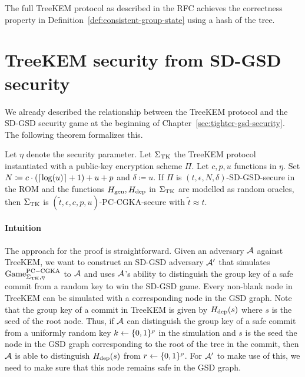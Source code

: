 The full TreeKEM protocol as described in the RFC achieves the correctness property in Definition~\ref{def:consistent-group-state} using a hash of the tree.

\section{TreeKEM security from SD-GSD security}


We already described the relationship between the TreeKEM protocol and the SD-GSD security game at the beginning of Chapter~\ref{sec:tighter-gsd-security}. The following theorem formalizes this.

\begin{theorem}
	Let $\eta$ denote the security parameter.
	Let $\Sigma_{\mathrm{TK}}$ the TreeKEM protocol instantiated with a public-key encryption scheme $\Pi$. Let $c, p, u$ functions in $\eta$. Set $N \coloneqq c \cdot (\lceil\log(u)\rceil + 1) + u + p$ and $\delta \coloneqq u$. If $\Pi$ is $(t, \epsilon, N, \delta)$-SD-GSD-secure in the ROM and the functions $H_\mathrm{gen}, H_\mathrm{dep}$ in $\Sigma_{\mathrm{TK}}$ are modelled as random oracles, then $\Sigma_{\mathrm{TK}}$ is $(\tilde{t}, \epsilon, c, p, u)$-PC-CGKA-secure with $\tilde{t} \approx t$.
\end{theorem}

\paragraph{Intuition} The approach for the proof is straightforward. Given an adversary $\mathcal{A}$ against TreeKEM, we want to construct an SD-GSD adversary $\mathcal{A}'$ that simulates $\mathrm{Game}_{\Sigma_{\mathrm{TK}}, \eta}^{\mathrm{PC-CGKA}}$ to $\mathcal{A}$ and uses $\mathcal{A}$'s ability to distinguish the group key of a safe commit from a random key to win the SD-GSD game. Every non-blank node in TreeKEM can be simulated with a corresponding node in the GSD graph. Note that the group key of a commit in TreeKEM is given by $H_\mathrm{dep}(s)$ where $s$ is the seed of the root node. Thus, if $\mathcal{A}$ can distinguish the group key of a safe commit from a uniformly random key $k \leftarrow \{0, 1\}^\rho$ in the simulation and $s$ is the seed the node in the GSD graph corresponding to the root of the tree in the commit, then $\mathcal{A}$ is able to distinguish $H_\mathrm{dep}(s)$ from $r \leftarrow \{0, 1\}^\rho$. For $\mathcal{A}'$ to make use of this, we need to make sure that this node remains safe in the GSD graph.

